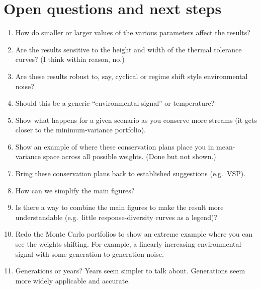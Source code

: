 \documentclass[12pt]{article}
\begin{document}
\section{Open questions and next steps}

\begin{enumerate}
\def\labelenumi{\arabic{enumi}.}
\itemsep1pt\parskip0pt
\item
  How do smaller or larger values of the various parameters affect the
  results?
\item
  Are the results sensitive to the height and width of the thermal
  tolerance curves? (I think within reason, no.)
\item
  Are these results robust to, say, cyclical or regime shift style
  environmental noise?
\item
  Should this be a generic ``environmental signal'' or temperature?
\item
  Show what happens for a given scenario as you conserve more streams
  (it gets closer to the minimum-variance portfolio).
\item
  Show an example of where these conservation plans place you in
  mean-variance space across all possible weights. (Done but not shown.)
\item
  Bring these conservation plans back to established suggestions
  (e.g.~VSP).
\item
  How can we simplify the main figures?
\item
  Is there a way to combine the main figures to make the result more
  understandable (e.g.~little response-diversity curves as a legend)?
\item
  Redo the Monte Carlo portfolios to show an extreme example where you
  can see the weights shifting. For example, a linearly increasing
  environmental signal with some generation-to-generation noise.
\item
  Generations or years? Years seem simpler to talk about. Generations
  seem more widely applicable and accurate.
\end{enumerate}

\clearpage



\renewcommand\refname{References}

\end{document}
